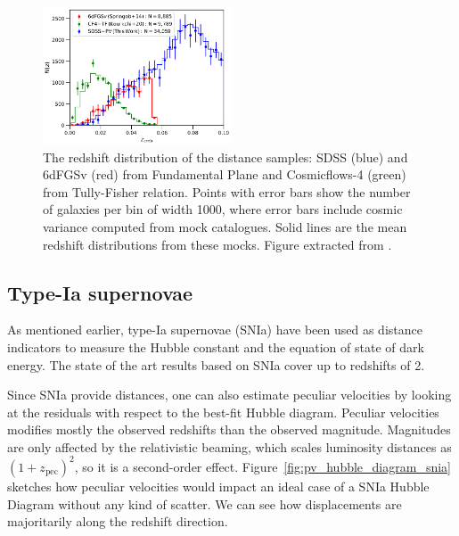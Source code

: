     \begin{figure}[t] 
        \centering 
        \includegraphics[width=0.5\textwidth]{fig/velocities/pv_zdistrib.png}
        \caption{The redshift distribution of the distance samples: 
        SDSS (blue) and 6dFGSv (red) from Fundamental Plane and 
        Cosmicflows-4 (green) from Tully-Fisher relation. 
        Points with error bars show the number of galaxies per bin of width 1000\kms, 
        where error bars include cosmic variance computed from mock catalogues.
        Solid lines are the mean redshift distributions from these mocks.
        Figure extracted from \cite{howlettSloanDigitalSky2022a}. }
        \label{fig:pv_zdistrib}
    \end{figure}




    \subsection{Type-Ia supernovae}
    \label{velocities:measuring:snia}

    As mentioned earlier, type-Ia supernovae (SNIa) have been used as distance indicators 
    to measure the Hubble constant and the equation of state of dark energy. 
    The state of the art results based on SNIa cover up to redshifts of 2. 

    Since SNIa provide distances, one can also estimate peculiar velocities by 
    looking at the residuals with respect to the best-fit Hubble diagram. 
    Peculiar velocities modifies mostly the observed redshifts than the 
    observed magnitude. Magnitudes are only affected by the relativistic 
    beaming, which scales luminosity distances as $(1+z_\text{pec})^2$, 
    so it is a second-order effect. 
    Figure~\ref{fig:pv_hubble_diagram_snia} sketches how peculiar velocities 
    would impact an ideal case of a SNIa Hubble Diagram without any kind of 
    scatter. We can see how displacements are majoritarily along the redshift direction. 


